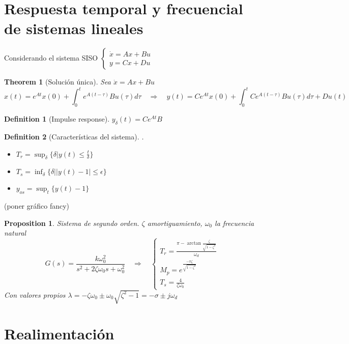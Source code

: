 \documentclass[leqno]{article}
\newtheorem*{theorem}{Theorem}
\newtheorem*{proposition}{Proposition}
\newtheorem*{definition}{Definition}
\begin{document}
\section{Respuesta temporal y frecuencial de sistemas lineales}


Considerando el sistema SISO $\displaystyle \begin{cases}
  \dot{x} = Ax + Bu \\
  y = Cx+Du
\end{cases}$

\begin{theorem}[Solución única] Sea $\dot{x} = Ax + Bu$ 
  \[
 x(t) = e^{At}x(0) + \int_0^t e^{A(t-\tau )}Bu(\tau )d\tau \quad  \Rightarrow \quad
 y(t) = Ce^{At}x(0) + \int_0^t Ce^{A(t-\tau )}Bu(\tau )d\tau + Du(t)
  \] 
\end{theorem}

\begin{definition}[Impulse response] $y_\delta(t) = Ce^{At}B$

\end{definition}

\begin{definition}[Características del sistema] . 
  \begin{itemize}[topsep=-6pt, itemsep=0pt]
	\item $T_r = \sup_{\delta} \{\delta | y(t)\le \frac{t}{\delta}\}$ 
	\item $T_s=\inf_{\delta} \{\delta| |y(t)-1|\le \epsilon \}$ 
	\item $y_{os}= \sup_t\{y(t)-1\}$
  \end{itemize}
\end{definition}

(poner gráfico fancy)

\begin{proposition}
Sistema de segundo orden. $\zeta$ amortiguamiento, $\omega _0$ la frecuencia natural
\[
G(s)=\frac{k\omega _0^2}{s^2+2\zeta \omega _0 s + \omega _{0}^2} \quad \Rightarrow \quad\begin{cases}
  T_r = \frac{\pi - \arctan \frac{\zeta}{\sqrt{1-\zeta^2} }}{\omega _d}\\
  M_p = e^{\frac{-\pi \zeta}{\sqrt{1-\zeta^2} }}\\
  T_s = \frac{4}{\zeta\omega _0}
\end{cases}
\] 
Con valores propios $\lambda= -\zeta \omega _0 \pm \omega _0\sqrt{\zeta^2-1}  = -\sigma \pm j\omega _d$
\end{proposition}


\section{Realimentación}
\end{document}
